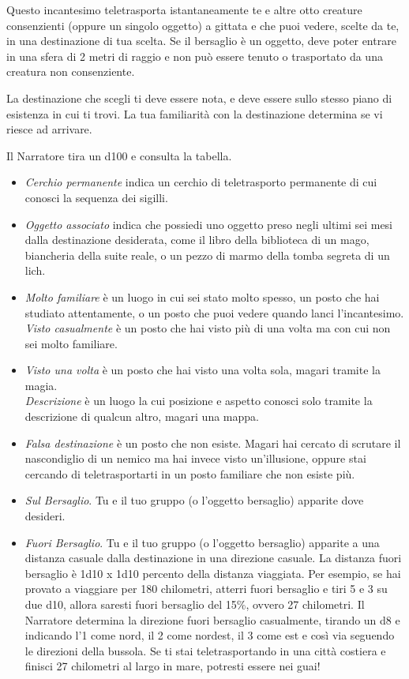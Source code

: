 \begin{multicols}{2}
Questo incantesimo teletrasporta istantaneamente te e altre otto creature consenzienti (oppure un singolo oggetto) a gittata e che puoi vedere, scelte da te, in una destinazione di tua scelta. Se il bersaglio è un oggetto, deve poter entrare in una sfera di 2 metri di raggio e non può essere tenuto o trasportato da una creatura non consenziente.

La destinazione che scegli ti deve essere nota, e deve essere sullo stesso piano di esistenza in cui ti trovi. La tua familiarità con la destinazione determina se vi riesce ad arrivare.

Il Narratore tira un d100 e consulta la tabella.

\begin{itemize}[leftmargin=*] \setlength{\itemsep}{0pt}
	\item \emph{Cerchio permanente} indica un cerchio di teletrasporto permanente di cui conosci la sequenza dei sigilli.
	\item \emph{Oggetto associato} indica che possiedi uno oggetto preso negli ultimi sei mesi dalla destinazione desiderata, come il libro della biblioteca di un mago, biancheria della suite reale, o un pezzo di marmo della tomba segreta di un lich.
	\item \emph{Molto familiare} è un luogo in cui sei stato molto spesso, un posto che hai studiato attentamente, o un posto che puoi vedere quando lanci l'incantesimo.
	\emph{Visto casualmente} è un posto che hai visto più di una volta ma con cui non sei molto familiare.
	\item \emph{Visto una volta} è un posto che hai visto una volta sola, magari tramite la magia.\\ \emph{Descrizione} è un luogo la cui posizione e aspetto conosci solo tramite la descrizione di qualcun altro, magari una mappa.
	\item \emph{Falsa destinazione} è un posto che non esiste. Magari hai cercato di scrutare il nascondiglio di un nemico ma hai invece visto un'illusione, oppure stai cercando di teletrasportarti in un posto familiare che non esiste più.
	\item \emph{Sul Bersaglio}. Tu e il tuo gruppo (o l'oggetto bersaglio) apparite dove desideri.
	\item \emph{Fuori Bersaglio}. Tu e il tuo gruppo (o l'oggetto bersaglio) apparite a una distanza casuale dalla destinazione in una direzione casuale. La distanza fuori bersaglio è 1d10 x 1d10 percento della distanza viaggiata. Per esempio, se hai provato a viaggiare per 180 chilometri, atterri fuori bersaglio e tiri 5 e 3 su due d10, allora saresti fuori bersaglio del 15\%, ovvero 27 chilometri. Il Narratore determina la direzione fuori bersaglio casualmente, tirando un d8 e indicando l'1 come nord, il 2 come nordest, il 3 come est e così via seguendo le direzioni della bussola. Se ti stai teletrasportando in una città costiera e finisci 27 chilometri al largo in mare, potresti essere nei guai!

\end{itemize}
\end{multicols}
